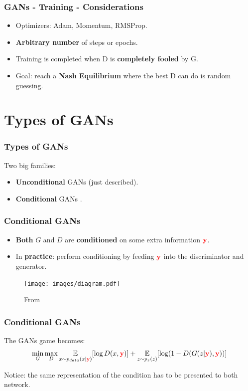 \documentclass{beamer}
\begin{document}
\begin{frame}
	\frametitle{GANs - Training - Considerations}
	\begin{itemize}
		\item Optimizers: Adam, Momentum, RMSProp.
		\item \textbf{Arbitrary number} of steps or epochs.
		\item Training is completed when D is \textbf{completely fooled} by G.
		\item Goal: reach a \textbf{Nash Equilibrium} where the best D can do is random guessing.
	\end{itemize}
 \end{frame}
 
\section{Types of GANs}

\begin{frame}
	\frametitle{Types of GANs}
	Two big families:
	\begin{itemize}
		\item \textbf{Unconditional} GANs (just described).
		\item \textbf{Conditional} GANs \citep{mirzaConditionalGenerativeAdversarial2014}.
	\end{itemize}
\end{frame}

\begin{frame}
	\frametitle{Conditional GANs}
	\begin{itemize}
		\item \textbf{Both} $G$ and $D$ are \textbf{conditioned} on some extra information $ \color{red} \mathbf{y}$.
		\item In \textbf{practice}:  perform conditioning by feeding $\color{red} \mathbf{y}$ into the discriminator and generator.
	\end{itemize}
	\vspace{-1cm}
	\begin{figure}
		\texttt{[image: images/diagram.pdf]}
		\vspace{-1cm}
		\caption{From \cite{mirzaConditionalGenerativeAdversarial2014}}
	\end{figure}
\end{frame}

\begin{frame}
	\frametitle{Conditional GANs}
	The GANs game becomes:
	$$ 
	\min_G \max_D \underset{x \sim p_{data}(x| \textcolor{red}{\mathbf{y}})}{\mathbb{E}} [\log D(x, \textcolor{red}{\mathbf{y}})]  +\underset{z \sim p_z(z)}{\mathbb{E}}[\log(1 - D(G(z|\textcolor{red}{\mathbf{y}}),\textcolor{red}{\mathbf{y}}))]
	$$

	\begin{block}{}
		Notice: the same representation of the condition has to be presented to both network.
	\end{block}
\end{frame}
\end{document}
